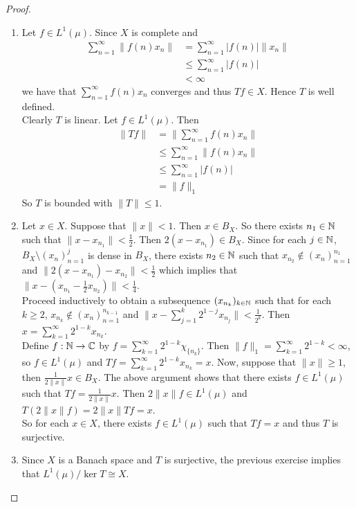 \documentclass{book}
\begin{document}
	\begin{proof}
		\begin{enumerate}
			\item Let $f \in L^1(\mu)$. Since $X$ is complete and 
			\begin{align*}
				\sum_{n=1}^{\infty}\|f(n)x_n \|
				& = \sum_{n=1}^{\infty} \vert f(n) \vert \|x_n \|\\
				& \leq \sum_{n=1}^{\infty} \vert f(n) \vert \\
				&< \infty 
			\end{align*}
			we have that $\sum_{n=1}^{\infty} f(n)x_n $ converges and thus $Tf \in X$. Hence $T$ is well defined. \vspace{.5cm}\\
			Clearly $T$ is linear. Let $f \in L^1(\mu)$. Then
			\begin{align*}
				\|Tf \|
				&= \| \sum_{n=1}^{\infty} f(n)x_n \|\\
				& \leq \sum_{n=1}^{\infty} \|f(n)x_n \|\\
				& \leq \sum_{n=1}^{\infty} \vert f(n) \vert \\
				&= \|f \|_1
			\end{align*}
			So $T$ is bounded with $\|T \|\leq 1$.\vspace{.5cm}\\
			\item Let $x \in X$. Suppose that $\|x \|< 1$. Then $x \in B_X$. So there exists $n_1 \in \mathbb{N}$ such that $\|x - x_{n_1} \|< \frac{1}{2}$. Then $2(x-x_{n_1}) \in B_X$. Since for each $j \in \mathbb{N}$, $B_X\setminus (x_n)_{n=1}^j$ is dense in $B_X$, there exists $n_2 \in \mathbb{N}$ such that $x_{n_2} \not \in (x_n)_{n=1}^{n_1}$ and $\|2(x- x_{n_1}) - x_{n_2} \|< \frac{1}{2}$ which implies that $\|x- (x_{n_1} - \frac{1}{2}x_{n_2}) \|< \frac{1}{4}$. \vspace{.5cm}\\ 
			Proceed inductively to obtain a subsequence $(x_{n_k})_{k \in \mathbb{N}}$ such that for each $k \geq 2$, $x_{n_k} \not \in (x_n)_{n=1}^{n_{k-1}}$ and $\|x - \sum_{j=1}^k 2^{1-j}x_{n_j} \|< \frac{1}{2^k}$. Then $x = \sum_{k=1}^{\infty}2^{1-k}x_{n_k}$. \vspace{.5cm} \\ 
			Define $f:\mathbb{N} \rightarrow \mathbb{C}$ by $f = \sum_{k=1}^{\infty}2^{1-k}\chi_{\{n_k\}}$. Then $\|f \|_1 = \sum_{k=1}^{\infty}2^{1-k}< \infty$, so $f \in L^1(\mu)$ and $Tf = \sum_{k=1}^{\infty}2^{1-k}x_{n_k} = x$. Now, suppose that $\|x \|\geq 1$, then $\frac{1}{2\|x \|}x \in B_X$. The above argument shows that there exists $f \in L^1(\mu)$ such that $Tf = \frac{1}{2\|x \|}x$. Then $2 \|x \|f \in L^1(\mu)$ and $T(2 \|x \|f) = 2 \|x \|Tf =x$. \\
			So for each $x \in X$, there exists $f \in L^1(\mu)$ such that $Tf = x$ and thus $T$ is surjective. 
			\item Since $X$ is a Banach space and $T$ is surjective, the previous exercise implies that $L^1(\mu)/\ker T \cong X$. 
		\end{enumerate}
	\end{proof}
	
\end{document}
